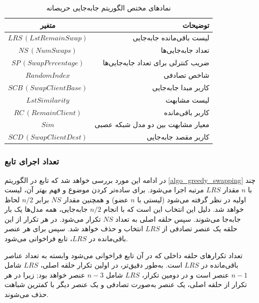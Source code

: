 \begin{table}[h]
	\centering
	\caption{نمادهای مختص الگوریتم جابه‌جایی حریصانه}
	\label{tabel_GreedySwappingNotations}
	\begin{tabular}{cr}
		\hline
		متغیر & توضیحات \\
		\hline
		$LRS \, (LstRemainSwap)$ & لیست باقی‌مانده جابه‌جایی \\
		$NS \, (NumSwaps)$ & تعداد جابه‌جایی‌ها \\
		$SP \, (SwapPercentage)$ & ضریب کنترلی برای تعداد جابه‌جایی‌ها \\
		$RandomIndex$ & شاخص تصادفی \\
		$SCB \, (SwapClientBase)$ & کاربر مبدا جابه‌جایی \\
		$LstSimilarity$ & لیست مشابهت \\
		$RC \, (RemainClient)$ & کاربر باقی‌مانده \\
		$Sim$ & معیار مشابهت بین دو مدل شبکه عصبی \\
		$SCD \, (SwapClientDest)$ & کاربر مقصد جابه‌جایی
	\end{tabular}
\end{table}


\vspace{3mm}
\subsubsection{
	تعداد اجرای تابع
}\label{sec_counting_model_similarity}\vspace{-1mm}
در ادامه این مورد بررسی خواهد شد که تابع
در الگوریتم
\ref{algo_greedy_swapping}
چند مرتبه اجرا می‌شود. 
برای ساده‌تر کردن موضوع و فهم بهتر آن، لیست ‎\(LRS\) با \( n \) مقدار اولیه در نظر گرفته می‌شود (لیستی با \( n \) عضو) و همچنین مقدار \( NS \) برابر \( n/2 \) لحاظ خواهد شد. دلیل این انتخاب این است که با انجام \( n/2 \) جابه‌جایی، همه مدل‌ها یک بار جابه‌جا می‌شوند.
سپس حلقه اصلی به تعداد \( NS \) تکرار می‌شود. در هر تکرار از این حلقه یک عنصر تصادفی از \( LRS \) انتخاب و حذف خواهد شد. سپس برای هر عنصر باقی‌مانده در \( LRS \)، تابع
فراخوانی می‌شود.

تعداد تکرارهای حلقه داخلی که در آن تابع
فراخوانی می‌شود وابسته به تعداد عناصر باقی‌مانده در \( LRS \) است. به‌طور دقیق‌تر، در اولین تکرار حلقه اصلی، \( LRS \) شامل \(n-1\) عنصر است و در دومین تکرار، \( LRS \) شامل \(n-3\) عنصر خواهد بود; زیرا در هر تکرار از حلقه اصلی، یک عنصر به‌صورت تصادفی و یک عنصر دیگر با کمترین شباهت حذف می‌شوند.

